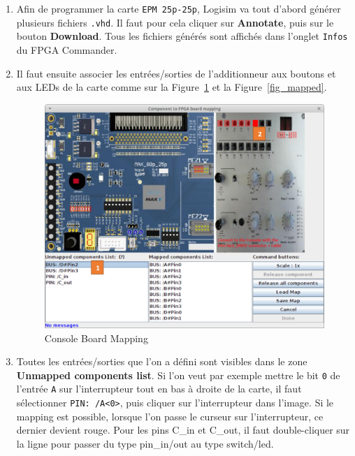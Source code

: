 \documentclass[nosolution]{exercice}
\begin{document}
\begin{enumerate}
\item Afin de programmer la carte \texttt{EPM 25p-25p}, Logisim va tout d'abord générer plusieurs fichiers
\texttt{.vhd}. Il faut pour cela cliquer sur \textbf{Annotate}, puis sur le bouton \textbf{Download}.
Tous les fichiers générés sont affichés dans l'onglet \texttt{Infos} du FPGA Commander.

\item Il faut ensuite associer les entrées/sorties de l'additionneur aux boutons et aux LEDs de la carte comme sur la
Figure~\ref{fig_mapping} et la Figure~\ref{fig_mapped}.

\begin{figure}[H]
\begin{center}
\includegraphics[width=400pt]{images/logisim_mapping.png}
\caption{\label{fig_mapping}Console Board Mapping}
\end{center}
\end{figure}

\item Toutes les entrées/sorties que l'on a défini sont visibles dans le zone \textbf{Unmapped components list}. Si l'on veut
par exemple mettre le bit \texttt{0} de l'entrée \texttt{A} sur l'interrupteur tout en bas à droite de la carte, il faut
sélectionner \texttt{PIN: /A<0>}, puis cliquer sur l'interrupteur dans l'image. Si le mapping est possible, lorsque l'on
passe le curseur sur l'interrupteur, ce dernier devient rouge. Pour les pins C\_in et C\_out, il faut double-cliquer sur la ligne pour passer du type pin\_in/out au type switch/led.



\end{enumerate}
\end{document}
